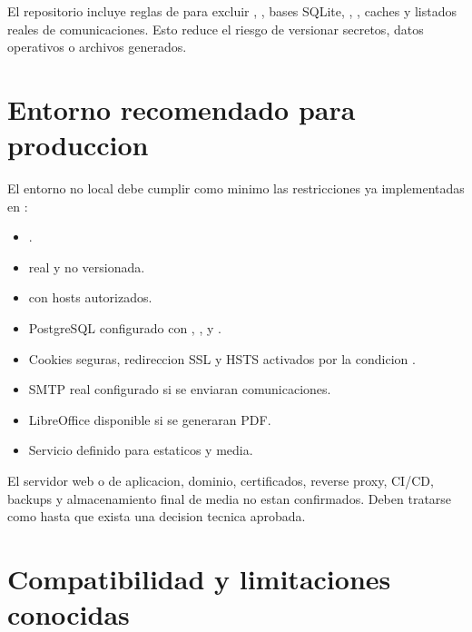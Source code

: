 El repositorio incluye reglas de  para excluir , , bases SQLite, , , caches y listados reales de comunicaciones. Esto reduce el riesgo de versionar secretos, datos operativos o archivos generados.

\section{Entorno recomendado para produccion}
\label{sec:requisitos-produccion}

El entorno no local debe cumplir como minimo las restricciones ya implementadas en :

\begin{itemize}
  \item {}.
  \item {} real y no versionada.
  \item {} con hosts autorizados.
  \item PostgreSQL configurado con , ,  y .
  \item Cookies seguras, redireccion SSL y HSTS activados por la condicion .
  \item SMTP real configurado si se enviaran comunicaciones.
  \item LibreOffice disponible si se generaran PDF.
  \item Servicio definido para estaticos y media.
\end{itemize}

\begin{advertencia}
El servidor web o de aplicacion, dominio, certificados, reverse proxy, CI/CD, backups y almacenamiento final de media no estan confirmados. Deben tratarse como \MarcadorProduccionPendiente{} hasta que exista una decision tecnica aprobada.
\end{advertencia}

\section{Compatibilidad y limitaciones conocidas}
\label{sec:requisitos-limitaciones}


